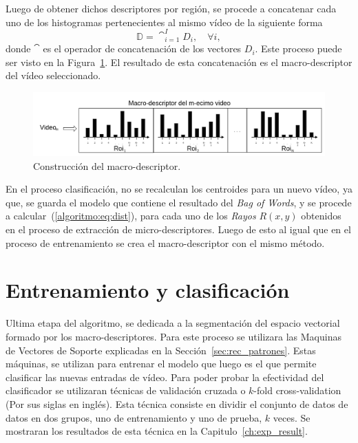 	
	Luego de obtener dichos descriptores por región, se procede a concatenar cada uno de los histogramas pertenecientes al mismo vídeo de la siguiente forma
	\begin{equation}
		\mathds{D} = \cat_{i = 1}^{I} D_i, \quad \forall i,
	\end{equation}	   
   donde $\cat$ es el operador de concatenación de los vectores $D_i$. Este proceso puede ser visto en la Figura~\ref{algoritmo:fig:macro-descriptores}. El resultado de esta concatenación es el macro-descriptor del vídeo seleccionado.
   
	\begin{figure}[bt]
		\centering
  		\label{algoritmo:fig:macro-descriptores}
    		\includegraphics[width=1\textwidth]{Figuras/Diagramas/macro-descriptor.png}
  		\caption{Construcción del macro-descriptor.}
	\end{figure}	

	En el proceso clasificación, no se recalculan los centroides para un nuevo vídeo, ya que, se guarda el modelo que contiene el resultado del \textit{Bag of Words}, y se procede a calcular~(\ref{algoritmo:eq:dist}), para cada uno de los \textit{Rayos} $R(x,y)$ obtenidos en el proceso de extracción de micro-descriptores. Luego de esto al igual que en el proceso de entrenamiento se crea el macro-descriptor con el mismo método.
	
	
\section{Entrenamiento y clasificación}
\label{sec:clasificacion}
Ultima etapa del algoritmo, se dedicada a la segmentación del espacio vectorial formado por los macro-descriptores. Para este proceso se utilizara las Maquinas de Vectores de Soporte explicadas en la Sección~\ref{sec:rec_patrones}. Estas máquinas, se utilizan para entrenar el modelo que luego es el que permite clasificar las nuevas entradas de vídeo. 
Para poder probar la efectividad del clasificador se utilizaran técnicas de validación cruzada o $k$-fold cross-validation (Por sus siglas en inglés). Esta técnica consiste en dividir el conjunto de datos de datos en dos grupos, uno de entrenamiento y uno de prueba, $k$ veces. Se mostraran los resultados de esta técnica en la Capitulo~\ref{ch:exp_result}.


